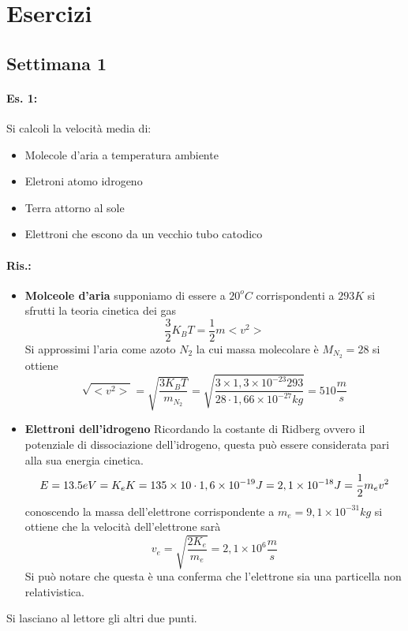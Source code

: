 \section{Esercizi}
\subsection{Settimana 1}
\paragraph{Es. 1:}
Si calcoli la velocità media di:
\begin{itemize}
\item Molecole d'aria a temperatura ambiente
\item Eletroni atomo idrogeno
\item Terra attorno al sole
\item Elettroni che escono da un vecchio tubo catodico
\end{itemize}
\paragraph{Ris.:}
\begin{itemize}
\item \textbf{Molceole d'aria}
supponiamo di essere a $20^oC$ corrispondenti a $293K$ si sfrutti la teoria cinetica dei gas
\begin{equation}
\frac{3}{2}K_BT=\frac{1}{2}m<v^2>
\end{equation}
Si approssimi l'aria come azoto $N_2$ la cui massa molecolare è $M_{N_2}=28$
si ottiene
\begin{equation}
\sqrt{<v^2>}=\sqrt{\frac{3K_BT}{m_{N_2}}}=\sqrt{\frac{3\times1,3\times10^{-23}293}{28\cdot 1,66\times10^{-27}kg}}=510\frac{m}{s}
\end{equation}
\item \textbf{Elettroni dell'idrogeno}
Ricordando la costante di Ridberg ovvero il potenziale di dissociazione dell'idrogeno, questa può essere considerata pari alla sua energia cinetica.
\begin{equation}
E=13.5eV=K_e\\
K=135\times10\cdot1,6\times10^{-19}J=2,1\times10^{-18}J=\frac{1}{2}m_ev^2
\end{equation}
conoscendo la massa dell'elettrone corrispondente a $m_e=9,1\times10^{-31}kg$ si ottiene che la velocità dell'elettrone sarà
\begin{equation}
v_e=\sqrt{\frac{2K_e}{m_e}}=2,1\times10^6\frac{m}{s}
\end{equation}
Si può notare che questa è una conferma che l'elettrone sia una particella non relativistica.
\end{itemize}
Si lasciano al lettore gli altri due punti.

